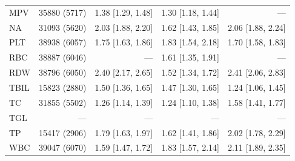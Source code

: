 \begin{table}[ht]
\begin{tabular}{lrrrr}
MPV & 35880 (5717) & 1.38 [1.29, 1.48] & 1.30 [1.18, 1.44] & --- \\
NA & 31093 (5620) & 2.03 [1.88, 2.20] & 1.62 [1.43, 1.85] & 2.06 [1.88, 2.24] \\
PLT & 38938 (6057) & 1.75 [1.63, 1.86] & 1.83 [1.54, 2.18] & 1.70 [1.58, 1.83] \\
RBC & 38887 (6046) & --- & 1.61 [1.35, 1.91] & --- \\
RDW & 38796 (6050) & 2.40 [2.17, 2.65] & 1.52 [1.34, 1.72] & 2.41 [2.06, 2.83] \\
TBIL & 15823 (2880) & 1.50 [1.36, 1.65] & 1.47 [1.30, 1.65] & 1.24 [1.06, 1.45] \\
TC & 31855 (5502) & 1.26 [1.14, 1.39] & 1.24 [1.10, 1.38] & 1.58 [1.41, 1.77] \\
TGL & --- & --- & --- & --- \\
TP & 15417 (2906) & 1.79 [1.63, 1.97] & 1.62 [1.41, 1.86] & 2.02 [1.78, 2.29] \\
WBC & 39047 (6070) & 1.59 [1.47, 1.72] & 1.83 [1.57, 2.14] & 2.11 [1.89, 2.35] \\
\bottomrule
\end{tabular}
\label{tab:13_cox_chs_ckd}
\end{table}